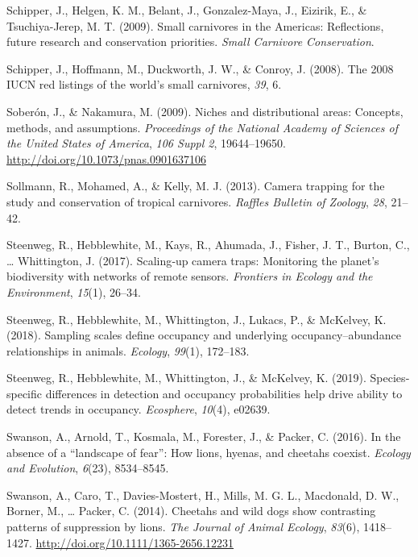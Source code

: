 \documentclass[12pt,twoside]{reedthesis}
\begin{document}
\leavevmode\hypertarget{ref-schipper_small_2009}{}%
Schipper, J., Helgen, K. M., Belant, J., Gonzalez-Maya, J., Eizirik, E., \& Tsuchiya-Jerep, M. T. (2009). Small carnivores in the Americas: Reflections, future research and conservation priorities. \emph{Small Carnivore Conservation}.

\leavevmode\hypertarget{ref-schipper_2008_2008}{}%
Schipper, J., Hoffmann, M., Duckworth, J. W., \& Conroy, J. (2008). The 2008 IUCN red listings of the world's small carnivores, \emph{39}, 6.

\leavevmode\hypertarget{ref-soberon_niches_2009}{}%
Soberón, J., \& Nakamura, M. (2009). Niches and distributional areas: Concepts, methods, and assumptions. \emph{Proceedings of the National Academy of Sciences of the United States of America}, \emph{106 Suppl 2}, 19644--19650. \url{http://doi.org/10.1073/pnas.0901637106}

\leavevmode\hypertarget{ref-sollmann_camera_2013}{}%
Sollmann, R., Mohamed, A., \& Kelly, M. J. (2013). Camera trapping for the study and conservation of tropical carnivores. \emph{Raffles Bulletin of Zoology}, \emph{28}, 21--42.

\leavevmode\hypertarget{ref-steenweg_scalingup_2017}{}%
Steenweg, R., Hebblewhite, M., Kays, R., Ahumada, J., Fisher, J. T., Burton, C., \ldots{} Whittington, J. (2017). Scaling‐up camera traps: Monitoring the planet's biodiversity with networks of remote sensors. \emph{Frontiers in Ecology and the Environment}, \emph{15}(1), 26--34.

\leavevmode\hypertarget{ref-steenweg_sampling_2018}{}%
Steenweg, R., Hebblewhite, M., Whittington, J., Lukacs, P., \& McKelvey, K. (2018). Sampling scales define occupancy and underlying occupancy--abundance relationships in animals. \emph{Ecology}, \emph{99}(1), 172--183.

\leavevmode\hypertarget{ref-steenweg_speciesspecific_2019}{}%
Steenweg, R., Hebblewhite, M., Whittington, J., \& McKelvey, K. (2019). Species‐specific differences in detection and occupancy probabilities help drive ability to detect trends in occupancy. \emph{Ecosphere}, \emph{10}(4), e02639.

\leavevmode\hypertarget{ref-swanson_absence_2016}{}%
Swanson, A., Arnold, T., Kosmala, M., Forester, J., \& Packer, C. (2016). In the absence of a ``landscape of fear'': How lions, hyenas, and cheetahs coexist. \emph{Ecology and Evolution}, \emph{6}(23), 8534--8545.

\leavevmode\hypertarget{ref-swanson_cheetahs_2014}{}%
Swanson, A., Caro, T., Davies-Mostert, H., Mills, M. G. L., Macdonald, D. W., Borner, M., \ldots{} Packer, C. (2014). Cheetahs and wild dogs show contrasting patterns of suppression by lions. \emph{The Journal of Animal Ecology}, \emph{83}(6), 1418--1427. \url{http://doi.org/10.1111/1365-2656.12231}
\end{document}
